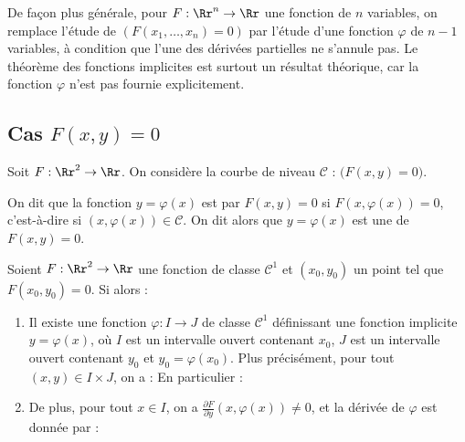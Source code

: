 \documentclass[11pt, class=report,crop=false]{standalone}
\begin{document}
\bigskip


De façon plus générale, pour $F : \Rr^n \to \Rr$ une fonction de $n$ variables, on remplace l'étude de $(F(x_1,\ldots,x_n)=0)$ par l'étude d'une fonction $\varphi$ de $n-1$ variables, à condition que l'une des dérivées partielles ne s'annule pas.
Le théorème des fonctions implicites est surtout un résultat théorique, car la fonction $\varphi$ n'est pas fournie explicitement.



\subsection{Cas $F(x,y) = 0$}

Soit $F : \Rr^2 \to \Rr$. On considère la courbe de niveau 
$\mathcal{C}$ : $\big( F(x,y) = 0 \big)$.

On dit que la fonction $y = \varphi(x)$ est  par $F(x,y) = 0$ si $F(x,\varphi(x)) = 0$, c'est-à-dire si $(x,\varphi(x)) \in \mathcal{C}$.
On dit alors que $y = \varphi(x)$ est une  de $F(x,y) = 0$.

    
\begin{theoreme}
Soient $F : \Rr^2 \to \Rr$ une fonction de classe $\mathcal{C}^1$ et $(x_0,y_0)$ un point tel que $F(x_0,y_0) = 0$.
Si 
alors :
\begin{enumerate}
    \item Il existe une fonction $\varphi : I \to J$ de classe $\mathcal{C}^1$ définissant une fonction implicite $y = \varphi(x)$, où $I$ est un intervalle ouvert contenant $x_0$, $J$ est un intervalle ouvert contenant $y_0$ et $y_0 = \varphi(x_0)$.
    Plus précisément, pour tout $(x,y) \in I \times J$, on a :
    En particulier : 
    
    
    \item De plus, pour tout $x \in I$, on a $\frac{\partial F}{\partial y}(x,\varphi(x)) \neq 0$, et la dérivée de $\varphi$ est donnée par :

\end{enumerate}
\end{theoreme}
\end{document}

